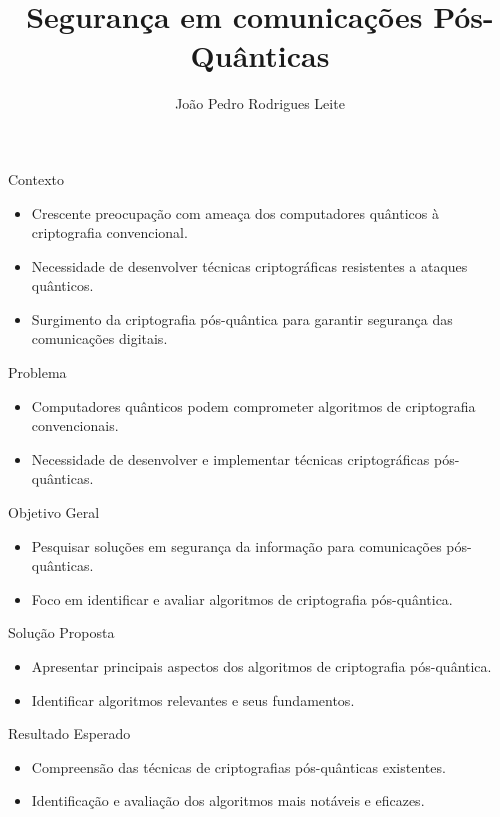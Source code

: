 \documentclass{beamer}
\title{Segurança em comunicações Pós-Quânticas}
\author{João Pedro Rodrigues Leite}
\date[Toledo, 2024]
\begin{document}
	
	\frame{\titlepage}
	
	\begin{frame}{Contexto}
		\begin{itemize}
			\item Crescente preocupação com ameaça dos computadores quânticos à criptografia convencional.
			\item Necessidade de desenvolver técnicas criptográficas resistentes a ataques quânticos.
			\item Surgimento da criptografia pós-quântica para garantir segurança das comunicações digitais.
		\end{itemize}
	\end{frame}
	
	\begin{frame}{Problema}
		\begin{itemize}
			\item Computadores quânticos podem comprometer algoritmos de criptografia convencionais.
			\item Necessidade de desenvolver e implementar técnicas criptográficas pós-quânticas.
		\end{itemize}
	\end{frame}
	
	\begin{frame}{Objetivo Geral}
		\begin{itemize}
			\item Pesquisar soluções em segurança da informação para comunicações pós-quânticas.
			\item Foco em identificar e avaliar algoritmos de criptografia pós-quântica.
		\end{itemize}
	\end{frame}
	
	\begin{frame}{Solução Proposta}
		\begin{itemize}
			\item Apresentar principais aspectos dos algoritmos de criptografia pós-quântica.
			\item Identificar algoritmos relevantes e seus fundamentos.
		\end{itemize}
	\end{frame}
	
	\begin{frame}{Resultado Esperado}
		\begin{itemize}
			\item Compreensão das técnicas de criptografias pós-quânticas existentes.
			\item Identificação e avaliação dos algoritmos mais notáveis e eficazes.
		\end{itemize}
	\end{frame}
	
\end{document}
